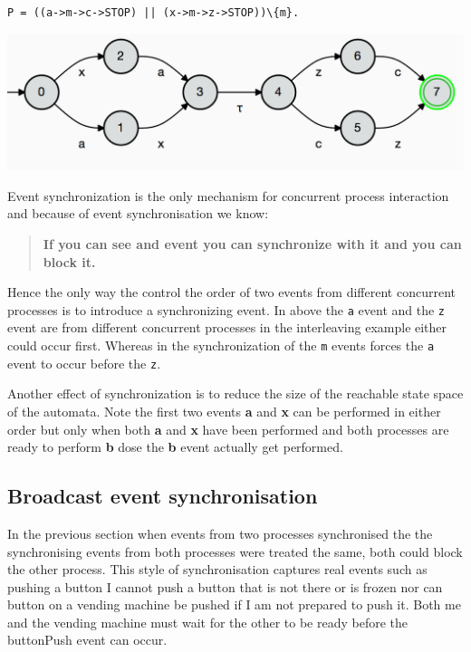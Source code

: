 \documentclass[]{article}
\begin{document}
 \begin{center}
\begin{minipage}{0.5\textwidth}
\begin{verbatim}
P = ((a->m->c->STOP) || (x->m->z->STOP))\{m}.
\end{verbatim}
\end{minipage}

\includegraphics[scale=0.5]{Sync.png}

\end{center}

\noindent Event synchronization is the only mechanism for concurrent process interaction and because of event synchronisation we know:

\begin{quote}
{\bf If you can see and event you can synchronize with it and you can block it.}
\end{quote}





 Hence the only way  the  control the order of two events from different concurrent   processes is to introduce a synchronizing event. In above the \verb$a$ event and the \verb$z$ event are from different concurrent processes in the interleaving example either could occur first. Whereas in the synchronization of the \verb$m$ events forces the \verb$a$ event to occur before the \verb$z$.

Another  effect of synchronization   is to reduce the size of the reachable state space of the automata. Note the first two events {\bf a} and {\bf x} can be performed in either order but only when both {\bf a} and {\bf x} have been performed and both processes are ready to perform {\bf b} dose the {\bf b}  event actually get performed.


\subsection{Broadcast event synchronisation}
In the previous section when events from two processes synchronised  the the synchronising events from both processes were treated the same, both could block the other process. This style of synchronisation captures real events such as {\sf pushing a button} I cannot push a button that is not there or is frozen nor can  button on a vending machine be pushed if  I am not prepared  to push it. Both me and the vending machine must wait for the other to be ready before the {\sf buttonPush} event can occur.
\end{document}
